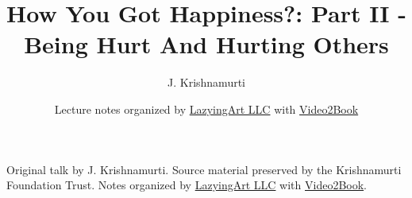 \documentclass[11pt,oneside]{book}
\begin{document}
\frontmatter
\title{How You Got Happiness?: Part II - Being Hurt And Hurting Others}
\author{J. Krishnamurti}
\date{Lecture notes organized by \href{https://lazying.art}{LazyingArt LLC} with \href{https://github.com/lachlanchen/Video2Book}{Video2Book}}
\maketitle
\begin{center}
\small Original talk by J. Krishnamurti. Source material preserved by the Krishnamurti Foundation Trust. Notes organized by \href{https://lazying.art}{LazyingArt LLC} with \href{https://github.com/lachlanchen/Video2Book}{Video2Book}.
\end{center}
\clearpage
\mainmatter

\end{document}

